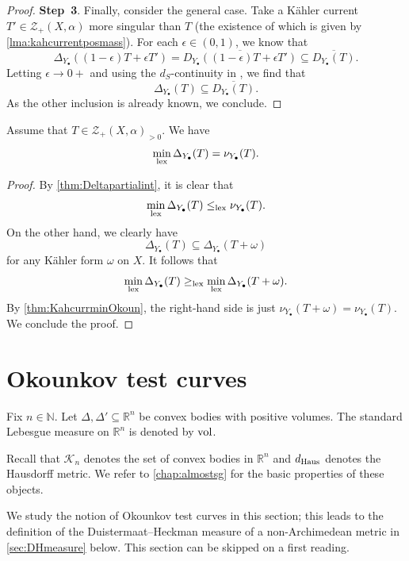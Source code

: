 \begin{proof}
\textbf{Step~3}.
Finally, consider the general case. Take a Kähler current $T'\in \mathcal{Z}_+(X,\alpha)$ more singular than $T$ (the existence of which is given by \cref{lma:kahcurrentposmass}). For each $\epsilon\in (0,1)$, we know that
\[
\Delta_{Y_{\bullet}}((1-\epsilon)T+\epsilon T')=\overline{D_{Y_{\bullet}}((1-\epsilon)T+\epsilon T')}
\subseteq \overline{D_{Y_{\bullet}}(T)}.
\]
Letting $\epsilon\to 0+$ and using the $d_S$-continuity in ,
we find that
\[
\Delta_{Y_{\bullet}}(T)\subseteq \overline{D_{Y_{\bullet}}(T)}.
\]
As the other inclusion is already known, we conclude.
\end{proof}

\begin{corollary}\label{cor:KahcurrminOkoun}
Assume that $T\in \mathcal{Z}_+(X,\alpha)_{>0}$.
We have
\begin{equation}\label{eq:minOkounkov3}
    \min_{\mathrm{lex}} \Delta_{Y_{\bullet}}(T)=\nu_{Y_{\bullet}}(T).
\end{equation}
\end{corollary}
\begin{proof}
    By \cref{thm:Deltapartialint}, it is clear that
    \[
    \min_{\mathrm{lex}} \Delta_{Y_{\bullet}}(T)\leq_{\mathrm{lex}}\nu_{Y_{\bullet}}(T).
    \]
    On the other hand, we clearly have
    \[
    \Delta_{Y_{\bullet}}(T)\subseteq \Delta_{Y_{\bullet}}(T+\omega)
    \]
    for any Kähler form $\omega$ on $X$. It follows that
    \[
    \min_{\mathrm{lex}} \Delta_{Y_{\bullet}}(T)\geq_{\mathrm{lex}} \min_{\mathrm{lex}} \Delta_{Y_{\bullet}}(T+\omega).
    \]
    By \cref{thm:KahcurrminOkoun}, the right-hand side is just $\nu_{Y_{\bullet}}(T+\omega)=\nu_{Y_{\bullet}}(T)$. We conclude the proof.
\end{proof}



\section{Okounkov test curves}\label{sec:Okotc}
Fix $n\in \mathbb{N}$.
Let $\Delta,\Delta'\subseteq \mathbb{R}^n$ be convex bodies with positive volumes. The standard Lebesgue measure on $\mathbb{R}^n$ is denoted by $\operatorname{vol}$.

Recall that $\mathcal{K}_n$ denotes the set of convex bodies in $\mathbb{R}^n$ and $d_{\mathrm{Haus}}$ denotes the Hausdorff metric.
We refer to \cref{chap:almostsg} for the basic properties of these objects.

We study the notion of Okounkov test curves in this section; this leads to the definition of the Duistermaat--Heckman measure of a non-Archimedean metric in \cref{sec:DHmeasure} below. This section can be skipped on a first reading.

